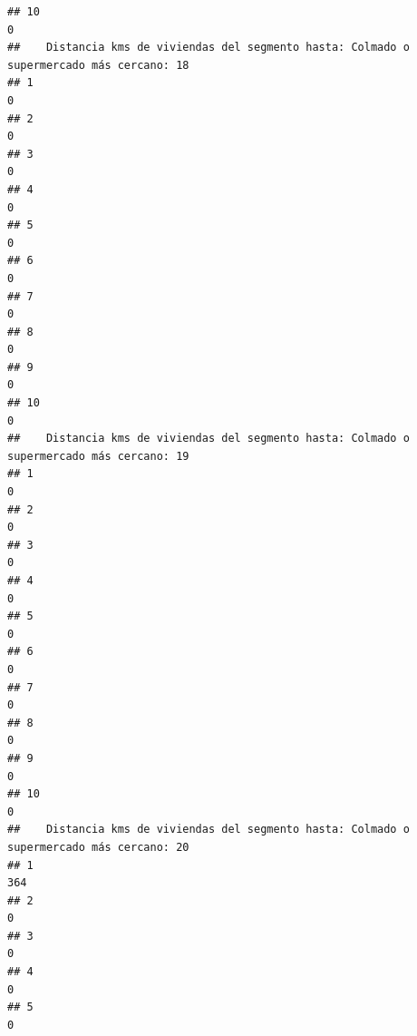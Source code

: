 \documentclass[11pt,]{article}
\begin{document}
\begin{verbatim}
## 10                                                                                     0
##    Distancia kms de viviendas del segmento hasta: Colmado o supermercado más cercano: 18
## 1                                                                                      0
## 2                                                                                      0
## 3                                                                                      0
## 4                                                                                      0
## 5                                                                                      0
## 6                                                                                      0
## 7                                                                                      0
## 8                                                                                      0
## 9                                                                                      0
## 10                                                                                     0
##    Distancia kms de viviendas del segmento hasta: Colmado o supermercado más cercano: 19
## 1                                                                                      0
## 2                                                                                      0
## 3                                                                                      0
## 4                                                                                      0
## 5                                                                                      0
## 6                                                                                      0
## 7                                                                                      0
## 8                                                                                      0
## 9                                                                                      0
## 10                                                                                     0
##    Distancia kms de viviendas del segmento hasta: Colmado o supermercado más cercano: 20
## 1                                                                                    364
## 2                                                                                      0
## 3                                                                                      0
## 4                                                                                      0
## 5                                                                                      0

\end{verbatim}
\end{document}
